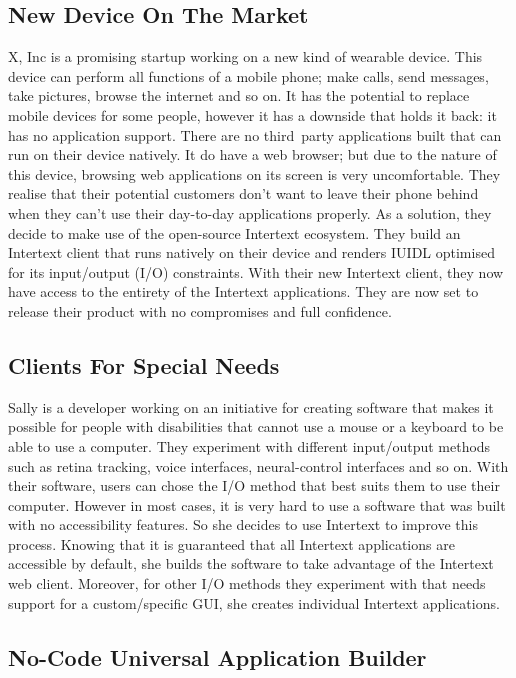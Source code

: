 \subsection{New Device On The Market}

X, Inc is a promising startup working on a new kind of wearable device. This device can perform all functions of a mobile phone; make calls, send messages, take pictures, browse the internet and so on. It has the potential to replace mobile devices for some people, however it has a downside that holds it back: it has no application support. There are no third~party applications built that can run on their device natively. It do have a web browser; but due to the nature of this device, browsing web applications on its screen is very uncomfortable. They realise that their potential customers don't want to leave their phone behind when they can't use their day-to-day applications properly. As a solution, they decide to make use of the open-source Intertext ecosystem. They build an Intertext client that runs natively on their device and renders IUIDL optimised for its input/output (I/O) constraints. With their new Intertext client, they now have access to the entirety of the Intertext applications. They are now set to release their product with no compromises and full confidence.

\subsection{Clients For Special Needs}

Sally is a developer working on an initiative for creating software that makes it possible for people with disabilities that cannot use a mouse or a keyboard to be able to use a computer. They experiment with different input/output methods such as retina tracking, voice interfaces, neural-control interfaces and so on. With their software, users can chose the I/O method that best suits them to use their computer. However in most cases, it is very hard to use a software that was built with no accessibility features. So she decides to use Intertext to improve this process. Knowing that it is guaranteed that all Intertext applications are accessible by default, she builds the software to take advantage of the Intertext web client. Moreover, for other I/O methods they experiment with that needs support for a custom/specific GUI, she creates individual Intertext applications.

\subsection{No-Code Universal Application Builder}

